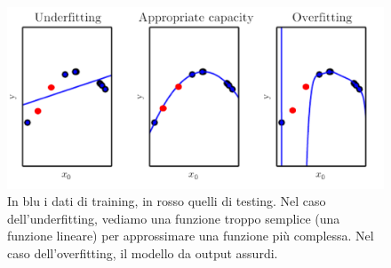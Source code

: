 \begin{figure}[htbp]
	\centering
	\includegraphics[width=\textwidth]{images/underoverfitting}
	\caption{In blu i dati di training, in rosso quelli di testing. Nel caso dell'underfitting, vediamo una funzione troppo semplice (una funzione lineare) per approssimare una funzione più complessa. Nel caso dell'overfitting, il modello da output assurdi.}
	\label{fig:underoverfitting}
\end{figure}